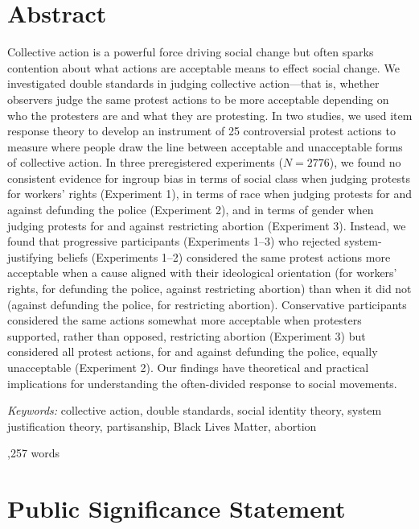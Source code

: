 \documentclass[12pt, letterpaper]{article}
\begin{document}
\section{Abstract}

\noindent Collective action is a powerful force driving social change
but often sparks contention about what actions are acceptable means to
effect social change. We investigated double standards in judging
collective action---that is, whether observers judge the same protest
actions to be more acceptable depending on who the protesters are and
what they are protesting. In two studies, we used item response theory
to develop an instrument of 25 controversial protest actions to measure
where people draw the line between acceptable and unacceptable forms of
collective action. In three preregistered experiments (\(N = 2776\)), we
found no consistent evidence for ingroup bias in terms of social class
when judging protests for workers' rights (Experiment 1), in terms of
race when judging protests for and against defunding the police
(Experiment 2), and in terms of gender when judging protests for and
against restricting abortion (Experiment 3). Instead, we found that
progressive participants (Experiments 1--3) who rejected
system-justifying beliefs (Experiments 1--2) considered the same protest
actions more acceptable when a cause aligned with their ideological
orientation (for workers' rights, for defunding the police, against
restricting abortion) than when it did not (against defunding the
police, for restricting abortion). Conservative participants considered
the same actions somewhat more acceptable when protesters supported,
rather than opposed, restricting abortion (Experiment 3) but considered
all protest actions, for and against defunding the police, equally
unacceptable (Experiment 2). Our findings have theoretical and practical
implications for understanding the often-divided response to social
movements.

\textit{Keywords:} collective action, double standards, social identity
theory, system justification theory, partisanship, Black Lives Matter,
abortion

\vfill

\begin{center}
,257 words
\end{center}

\vfill

\section{Public Significance Statement}
\end{document}
